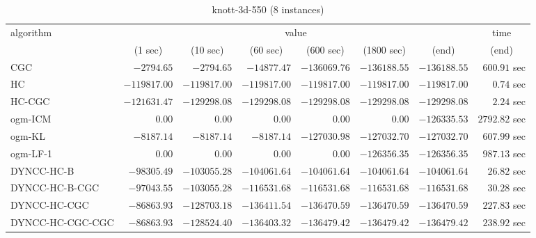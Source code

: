 \begin{table}[H]
\scriptsize
\centering
\caption{knott-3d-550 (8 instances)}
\label{tab:anytimetable-knott-3d-550}
\begin{tabular}{lrrrrrrr}
\toprule
           algorithm &                                   \multicolumn{6}{c}{value} & \multicolumn{1}{c}{time}   \\  
\cmidrule(lr){2-7}\cmidrule(lr){8-8}  
                     & \multicolumn{1}{c}{(1 sec)} & \multicolumn{1}{c}{(10 sec)} & \multicolumn{1}{c}{(60 sec)} & \multicolumn{1}{c}{(600 sec)} & \multicolumn{1}{c}{(1800 sec)} & \multicolumn{1}{c}{(end)} & \multicolumn{1}{c}{(end)}   \\ \midrule 
                 CGC & $     -2794.65$ & $     -2794.65$ & $    -14877.47$ & $   -136069.76$ & $   -136188.55$ & $   -136188.55$ & $       600.91$ sec   \\ 
                  HC & $   -119817.00$ & $   -119817.00$ & $   -119817.00$ & $   -119817.00$ & $   -119817.00$ & $   -119817.00$ & $         0.74$ sec   \\ 
              HC-CGC & $   -121631.47$ & $   -129298.08$ & $   -129298.08$ & $   -129298.08$ & $   -129298.08$ & $   -129298.08$ & $         2.24$ sec   \\ 
             ogm-ICM & $         0.00$ & $         0.00$ & $         0.00$ & $         0.00$ & $         0.00$ & $   -126335.53$ & $      2792.82$ sec   \\ 
              ogm-KL & $     -8187.14$ & $     -8187.14$ & $     -8187.14$ & $   -127030.98$ & $   -127032.70$ & $   -127032.70$ & $       607.99$ sec   \\ 
            ogm-LF-1 & $         0.00$ & $         0.00$ & $         0.00$ & $         0.00$ & $   -126356.35$ & $   -126356.35$ & $       987.13$ sec   \\ 
          DYNCC-HC-B & $    -98305.49$ & $   -103055.28$ & $   -104061.64$ & $   -104061.64$ & $   -104061.64$ & $   -104061.64$ & $        26.82$ sec   \\ 
      DYNCC-HC-B-CGC & $    -97043.55$ & $   -103055.28$ & $   -116531.68$ & $   -116531.68$ & $   -116531.68$ & $   -116531.68$ & $        30.28$ sec   \\ 
        DYNCC-HC-CGC & $    -86863.93$ & $   -128703.18$ & $   -136411.54$ & $   -136470.59$ & $   -136470.59$ & $   -136470.59$ & $       227.83$ sec   \\ 
    DYNCC-HC-CGC-CGC & $    -86863.93$ & $   -128524.40$ & $   -136403.32$ & $   -136479.42$ & $   -136479.42$ & $   -136479.42$ & $       238.92$ sec   \\ 

\end{tabular}
\end{table}
